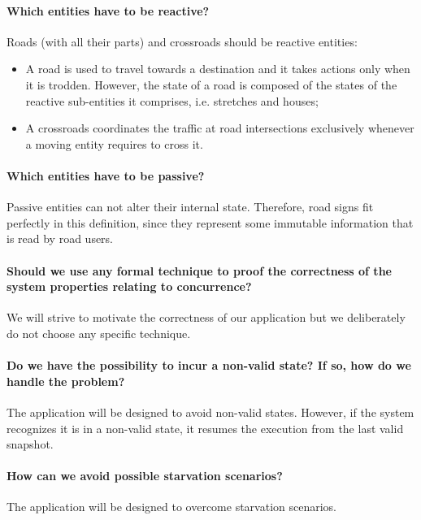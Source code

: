 \paragraph{Which entities have to be reactive?}
Roads (with all their parts) and crossroads should be reactive entities:
\begin{itemize}
  \item A road is used to travel towards a destination
  and it takes actions only when it is trodden.
  However, the state of a road is composed of the states
  of the reactive sub-entities it comprises, i.e. stretches and houses;
  \item A crossroads coordinates the traffic at road intersections
  exclusively whenever a moving entity requires to cross it.
\end{itemize}

\paragraph{Which entities have to be passive?}
Passive entities can not alter their internal state.
Therefore, road signs fit perfectly in this definition, since
they represent some immutable information that is read by road users.

\paragraph{Should we use any formal technique to proof the correctness
of the system properties relating to concurrence?}
We will strive to motivate the correctness of our application
but we deliberately do not choose any specific technique.

\paragraph{Do we have the possibility to incur a non-valid state?
If so, how do we handle the problem?}
The application will be designed to avoid non-valid states.
However, if the system recognizes it is in a non-valid state,
it resumes the execution from the last valid snapshot.

\paragraph{How can we avoid possible starvation scenarios?}
The application will be designed to overcome starvation scenarios.

